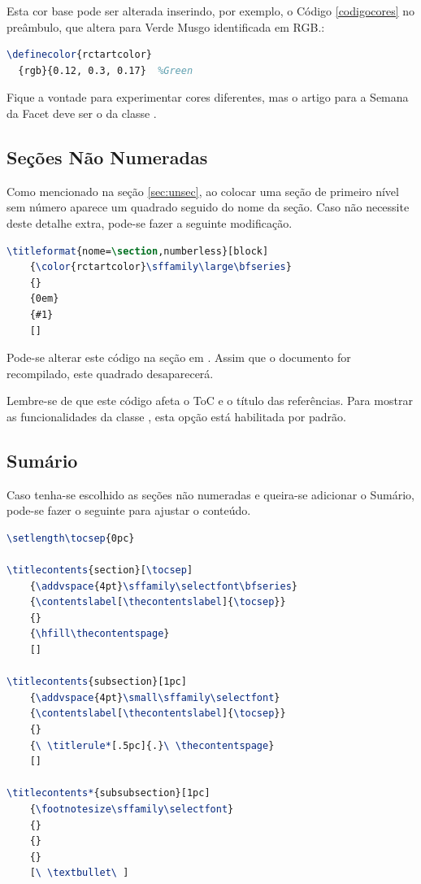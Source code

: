 \documentclass[12pt,a4paper,oneside,linenumbers=off,latinmodern=off,timesnews=off,spanish,english,portuges]{rctart-class/rctart}
\begin{document}
        Esta cor base pode ser alterada inserindo, por exemplo, o Código \ref{codigocores} no preâmbulo, que altera para Verde Musgo identificada em RGB.:
\begin{lstlisting}[language=TeX, caption=Alteração da cor base,label=codigocores]
\definecolor{rctartcolor}
  {rgb}{0.12, 0.3, 0.17}  %Green
\end{lstlisting}

Fique a vontade para experimentar cores diferentes, mas o artigo para a Semana da Facet deve ser o da classe .

 \subsection{Seções Não Numeradas}

        Como mencionado na seção \ref{sec:unsec}, ao colocar uma seção de primeiro nível sem número aparece um quadrado seguido do nome da seção. Caso não necessite deste detalhe extra, pode-se fazer a seguinte modificação.

\nolinenumbers
\begin{lstlisting}[language=TeX, caption=Seção alternativa não numerada.]
\titleformat{nome=\section,numberless}[block]
    {\color{rctartcolor}\sffamily\large\bfseries}
    {}
    {0em}
    {#1}
    []
\end{lstlisting}
\linenumbers

        Pode-se alterar este código na seção  em . Assim que o documento for recompilado, este quadrado desaparecerá. 

        Lembre-se de que este código afeta o ToC e o título das referências. Para mostrar as funcionalidades da classe , esta opção está habilitada por padrão.

    \subsection{Sumário}
    
        Caso  tenha-se escolhido as seções não numeradas e queira-se adicionar o Sumário,  pode-se fazer o seguinte para ajustar o conteúdo.

\nolinenumbers
\begin{lstlisting}[language=TeX, caption=ToC quando seção não numerada é escolhida.]
\setlength\tocsep{0pc}

\titlecontents{section}[\tocsep]
    {\addvspace{4pt}\sffamily\selectfont\bfseries}
    {\contentslabel[\thecontentslabel]{\tocsep}}
    {}
    {\hfill\thecontentspage}
    []

\titlecontents{subsection}[1pc]
    {\addvspace{4pt}\small\sffamily\selectfont}
    {\contentslabel[\thecontentslabel]{\tocsep}}
    {}
    {\ \titlerule*[.5pc]{.}\ \thecontentspage}
    []

\titlecontents*{subsubsection}[1pc]
    {\footnotesize\sffamily\selectfont}
    {}
    {}
    {}
    [\ \textbullet\ ]
\end{lstlisting}
\linenumbers
\end{document}
